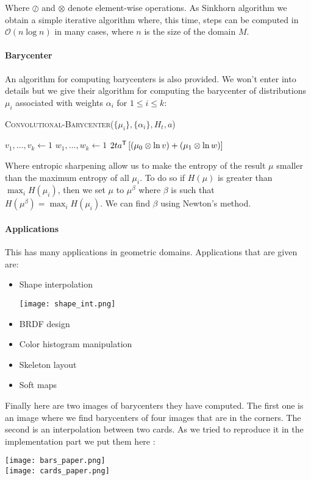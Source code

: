 Where $\oslash$ and $\otimes$ denote element-wise operations. As Sinkhorn algorithm we obtain a simple iterative algorithm where, this time, steps can be computed in $\mathcal{O}(n \log n)$ in many cases, where $n$ is the size of the domain $M$.

\paragraph{Barycenter}
An algorithm for computing barycenters is also provided. We won't enter into details but we give their algorithm for computing the barycenter of distributions $\mu_i$ associated with weights $\alpha_i$ for $1 \leqslant i \leqslant k$:

\vspace{3mm}
\begin{algorithm}[H]
	\caption{\textsc{Convolutional-Barycenter}($\{\mu_i\}, \{ \alpha_i \}, H_t, a$)}
	$v_1, \dots, v_k \gets 1$ \;
	$w_1, \dots, w_k \gets 1$ \;
	\Return $2t a^{\mathsf{T}} \left[ \left( \mu_0 \otimes \ln v \right) + \left( \mu_1 \otimes \ln w \right) \right]$
\end{algorithm}
\vspace{3mm}
Where entropic sharpening allow us to make the entropy of the result $\mu$ smaller than the maximum entropy of all $\mu_i$. To do so if $H(\mu)$ is greater than $\max_i H(\mu_i)$, then we set $\mu$ to $\mu^\beta$ where $\beta$ is such that $H(\mu^\beta) = \max_i H(\mu_i)$. We can find $\beta$ using Newton's method.

\paragraph{Applications}
This has many applications in geometric domains. Applications that are given are:
\begin{itemize}
	\item Shape interpolation
		\begin{center}
		\texttt{[image: shape\_int.png]}
		\end{center}
	\item BRDF design
	\item Color histogram manipulation
	\item Skeleton layout
	\item Soft maps
\end{itemize}
Finally here are two images of barycenters they have computed. The first one is an image where we find barycenters of four images that are in the corners. The second is an interpolation between two cards. As we tried to reproduce it in the implementation part we put them here :

\begin{center}
	\texttt{[image: bars\_paper.png]} \\ \vspace{3mm}
	\texttt{[image: cards\_paper.png]}
\end{center}